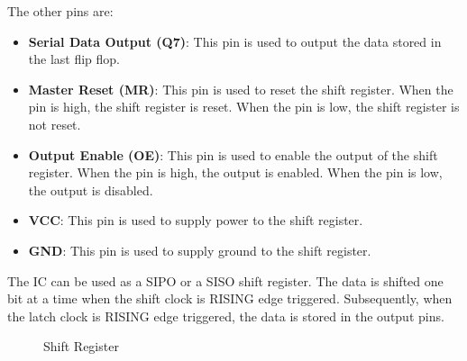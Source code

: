 \documentclass[12pt, a4paper, oneside]{report}
\begin{document}
The other pins are:
\begin{itemize}
    \item \textbf{Serial Data Output (Q7)}: This pin is used to output the data stored in the last flip flop.
    \item \textbf{Master Reset (MR)}: This pin is used to reset the shift register. When the pin is high, the shift register is reset. When the pin is low, the shift register is not reset.
    \item \textbf{Output Enable (OE)}: This pin is used to enable the output of the shift register. When the pin is high, the output is enabled. When the pin is low, the output is disabled.
    \item \textbf{VCC}: This pin is used to supply power to the shift register.
    \item \textbf{GND}: This pin is used to supply ground to the shift register.
\end{itemize}

The IC can be used as a SIPO or a SISO shift register. The data is shifted one bit at a time when the shift clock is RISING edge triggered. Subsequently, when the latch clock is RISING edge triggered, the data is stored in the output pins. 


\begin{figure}[H]
    \centering
    \hfill
    \hfill
    \par 
    \caption{Shift Register}
    \label{fig: shift_register}
\end{figure}
\end{document}
